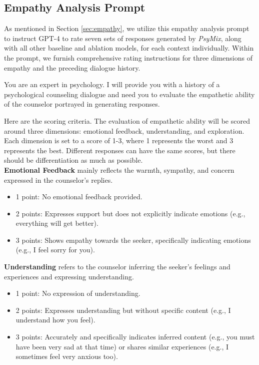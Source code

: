 \subsection{Empathy Analysis Prompt}
As mentioned in Section \ref{sec:empathy}, we utilize this empathy analysis prompt to instruct GPT-4 to rate seven sets of responses generated by \textit{PsyMix}, along with all other baseline and ablation models, for each context individually. Within the prompt, we furnish comprehensive rating instructions for three dimensions of empathy and the preceding dialogue history.
\begin{figure*}
\begin{tcolorbox}[title = {Prompt for Empathy Analysis}]
\small
You are an expert in psychology. I will provide you with a history of a psychological counseling dialogue and need you to evaluate the empathetic ability of the counselor portrayed in generating responses.

Here are the scoring criteria. The evaluation of empathetic ability will be scored around three dimensions: emotional feedback, understanding, and exploration. Each dimension is set to a score of 1-3, where 1 represents the worst and 3 represents the best. Different responses can have the same scores, but there should be differentiation as much as possible.
\\

\textbf{Emotional Feedback} mainly reflects the warmth, sympathy, and concern expressed in the counselor's replies.
\begin{itemize}
    \item 1 point: No emotional feedback provided.
    \item 2 points: Expresses support but does not explicitly indicate emotions (e.g., everything will get better).
    \item 3 points: Shows empathy towards the seeker, specifically indicating emotions (e.g., I feel sorry for you).
\end{itemize}

\medskip

\textbf{Understanding} refers to the counselor inferring the seeker's feelings and experiences and expressing understanding.
\begin{itemize}
    \item 1 point: No expression of understanding.
    \item 2 points: Expresses understanding but without specific content (e.g., I understand how you feel).
    \item 3 points: Accurately and specifically indicates inferred content (e.g., you must have been very sad at that time) or shares similar experiences (e.g., I sometimes feel very anxious too).
\end{itemize}


\end{tcolorbox}
\end{figure*}
